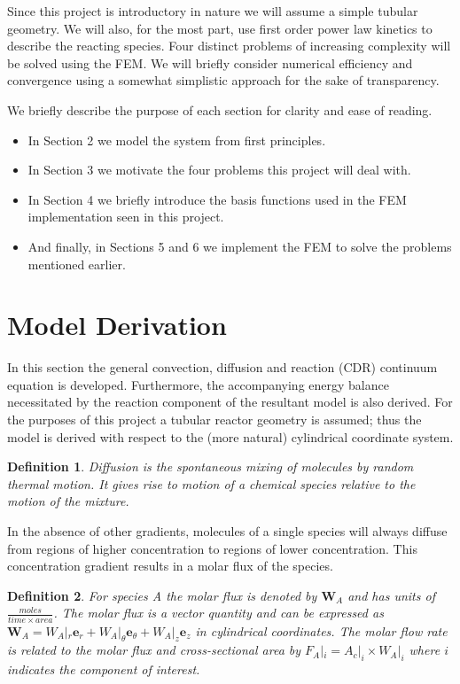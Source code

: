 \documentclass[11pt,fleqn]{article}
\theoremstyle{defstyle}
\newtheorem{defn}{Definition}[section]
\begin{document}
Since this project is introductory in nature we will assume a simple tubular geometry. We will also, for the most part, use first order power law kinetics to describe the reacting species. Four distinct problems of increasing complexity will be solved using the FEM. We will briefly consider numerical efficiency and convergence using a somewhat simplistic approach for the sake of transparency.  

We briefly describe the purpose of each section for clarity and ease of reading.
\begin{itemize}
\item 
In Section 2 we model the system from first principles.
\item
In Section 3 we motivate the four problems this project will deal with.
\item
In Section 4 we briefly introduce the basis functions used in the FEM implementation seen in this project.
\item
And finally, in Sections 5 and 6 we implement the FEM to solve the problems mentioned earlier.
\end{itemize}

\section{Model Derivation}
In this section the general convection, diffusion and reaction (CDR) continuum equation is developed. Furthermore, the accompanying energy balance necessitated by the reaction component of the resultant model is also derived. For the purposes of this project a tubular reactor geometry is assumed; thus the model is derived with respect to the (more natural) cylindrical coordinate system. 

\begin{defn}
Diffusion is the spontaneous mixing of molecules by random thermal motion. It gives rise to motion of a chemical species relative to the motion of the mixture.
\end{defn}

In the absence of other gradients, molecules of a single species will always diffuse from regions of higher concentration to regions of lower concentration. This concentration gradient results in a molar flux of the species.

\begin{defn}
For species A the molar flux is denoted by $\mathbf{W}_A$ and has units of $\frac{moles}{time \times area}$. The molar flux is a vector quantity and can be expressed as $\mathbf{W}_A = W_A|_r \mathbf{e}_r + W_A|_\theta \mathbf{e}_\theta + W_A|_z \mathbf{e}_z$ in cylindrical coordinates. The molar flow rate is related to the molar flux and cross-sectional area by $F_A|_i = A_c|_i \times W_A|_i$ where $i$ indicates the component of interest. 
\end{defn}
\end{document}

